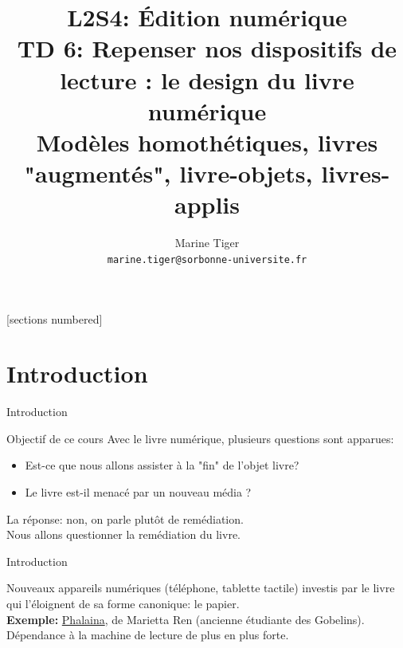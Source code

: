 \documentclass[svgnames,smaller,10pt]{beamer}
\title{L2S4: Édition numérique\\
TD 6: Repenser nos dispositifs de lecture : le design du livre numérique
\\
\small
Modèles homothétiques, livres "augmentés", livre-objets, livres-applis
}
\date{}
\author{Marine Tiger\\   \texttt{marine.tiger@sorbonne-universite.fr}}
\institute{Littératures françaises et comparée ED19, CELLF, Sorbonne Université}
\begin{document}
\maketitle
{}[sections numbered]

\section{Introduction}

\begin{frame}{Introduction}
\begin{block}{Objectif de ce cours}
    \vspace{1em}
    Avec le livre numérique, plusieurs questions sont apparues:
    \begin{itemize}
        \item Est-ce que nous allons assister à la "fin" de l'objet livre?
        \item Le livre est-il menacé par un nouveau média ?
    \end{itemize}
    
    La réponse: non, on parle plutôt de remédiation.\\

    Nous allons questionner la remédiation du livre.

\end{block}

\end{frame}

\begin{frame}{Introduction}
    
    Nouveaux appareils numériques (téléphone, tablette tactile) investis par le livre qui l'éloignent de sa forme canonique: le papier. \\

    \textbf{Exemple:} \href{https://cours-edition-litterature-numerique-l2-92cac3.gitpages.huma-num.fr/img/phallainaChap1.mp4}{Phalaina}, de Marietta Ren (ancienne étudiante des Gobelins). \\

    Dépendance à la machine de lecture de plus en plus forte.
\end{frame}
\end{document}
